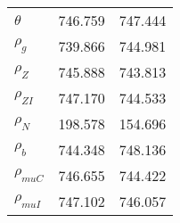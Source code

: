 \begin{center}
\begin{longtable}{lcc}
$ {\theta}             $	 & 	     746.759	 & 	     747.444 \\ 
$ {\rho_g}             $	 & 	     739.866	 & 	     744.981 \\ 
$ {\rho_Z}             $	 & 	     745.888	 & 	     743.813 \\ 
$ {\rho_{ZI}}          $	 & 	     747.170	 & 	     744.533 \\ 
$ {\rho_N}             $	 & 	     198.578	 & 	     154.696 \\ 
$ {\rho_b}             $	 & 	     744.348	 & 	     748.136 \\ 
$ {\rho_{muC}}         $	 & 	     746.655	 & 	     744.422 \\ 
$ {\rho_{muI}}         $	 & 	     747.102	 & 	     746.057 \\ 
\end{longtable}
 \end{center}
